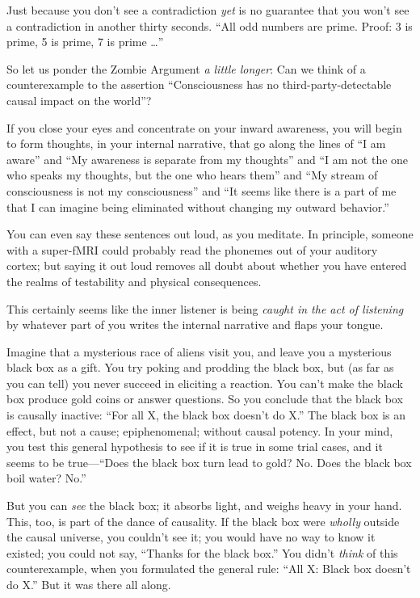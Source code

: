 {
 Just because you don't see a contradiction
\textit{yet} is no guarantee that you won't see a
contradiction in another thirty seconds. ``All odd
numbers are prime. Proof: 3 is prime, 5 is prime, 7 is prime
\ldots''}

{
 So let us ponder the Zombie Argument \textit{a little longer}: Can
we think of a counterexample to the assertion
``Consciousness has no third-party-detectable causal
impact on the world''?}

{
 If you close your eyes and concentrate on your inward awareness,
you will begin to form thoughts, in your internal narrative, that go
along the lines of ``I am aware''
and ``My awareness is separate from my
thoughts'' and ``I am not the one
who speaks my thoughts, but the one who hears them''
and ``My stream of consciousness is not my
consciousness'' and ``It seems like
there is a part of me that I can imagine being eliminated without
changing my outward behavior.''}

{
 You can even say these sentences out loud, as you meditate. In
principle, someone with a super-fMRI could probably read the phonemes
out of your auditory cortex; but saying it out loud removes all doubt
about whether you have entered the realms of testability and physical
consequences.}

{
 This certainly seems like the inner listener is being
\textit{caught in the act of listening} by whatever part of you writes
the internal narrative and flaps your tongue.}

{
 Imagine that a mysterious race of aliens visit you, and leave you
a mysterious black box as a gift. You try poking and prodding the black
box, but (as far as you can tell) you never succeed in eliciting a
reaction. You can't make the black box produce gold
coins or answer questions. So you conclude that the black box is
causally inactive: ``For all X, the black box
doesn't do X.'' The black box is an
effect, but not a cause; epiphenomenal; without causal potency. In your
mind, you test this general hypothesis to see if it is true in some
trial cases, and it seems to be true---``Does the
black box turn lead to gold? No. Does the black box boil water?
No.''}

{
 But you can \textit{see} the black box; it absorbs light, and
weighs heavy in your hand. This, too, is part of the dance of
causality. If the black box were \textit{wholly} outside the causal
universe, you couldn't see it; you would have no way to
know it existed; you could not say, ``Thanks for the
black box.'' You didn't
\textit{think} of this counterexample, when you formulated the general
rule: ``All X: Black box doesn't do
X.'' But it was there all along.}

